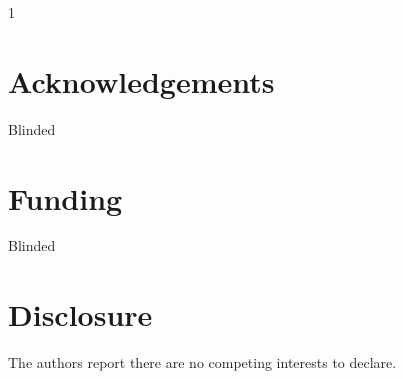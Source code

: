 \documentclass[12pt]{article}
\newcommand{\blind}{1}
\begin{document}
\blind
\section*{Acknowledgements}
Blinded

\section*{Funding}
Blinded
\fi

\section*{Disclosure}
The authors report there are no competing interests to declare.




\newpage
\begin{appendix}

\end{appendix}
\end{document}
